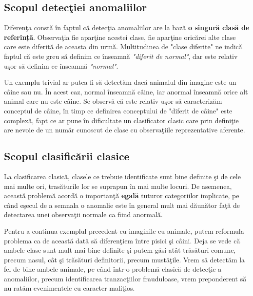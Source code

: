 \subsection{Scopul detecţiei anomaliilor}

Diferenţa constă în faptul că detecţia anomaliilor are la bază \textbf{o singură clasă
de referință}. Observaţia fie aparţine acestei clase, fie aparţine oricărei alte clase 
care este diferită de aceasta din urmă. Multitudinea de "clase diferite" ne indică
faptul că este greu să definim ce înseamnă \textit{"diferit de normal"}, dar este relativ uşor
să definim ce înseamnă \textit{"normal"}.

Un exemplu trivial ar putea fi să detectăm dacă animalul din imagine este un câine sau nu.
În acest caz, normal înseamnă câine, iar anormal înseamnă orice alt animal care nu este
câine. Se observă că este relativ uşor să caracterizăm conceptul de câine, în timp ce 
definirea conceptului de "diferit de câine" este complexă, fapt ce ar pune în dificultate
un clasificator clasic care prin definiţie are nevoie de un număr cunoscut de clase 
cu observaţiile reprezentative aferente.

\subsection{Scopul clasificării clasice}

La clasificarea clasică, clasele ce trebuie identificate sunt bine 
definite şi de cele mai multe ori, trasăturile lor se suprapun în mai multe locuri. De 
asemenea, această problemă acordă o importanţă \textbf{egală} tuturor categoriilor
implicate, pe când 
eşecul de a semnala o anomalie este în general mult mai dăunător faţă de 
detectarea unei observaţii normale ca fiind anormală. 

Pentru a continua exemplul precedent cu imaginile cu animale, putem reformula problema 
ca de această dată să diferenţiem între pisici şi câini. Deja se vede că ambele clase 
sunt mult mai bine definite şi putem găsi atât trăsături comune, precum nasul, cât şi 
trăsături definitorii, precum mustăţile. Vrem să detectăm la fel de bine ambele animale, 
pe când într-o problemă clasică de detecţie a anomaliilor, precum identificarea 
tranzacţiilor frauduloase, vrem preponderent să nu ratăm evenimentele cu 
caracter maliţios.